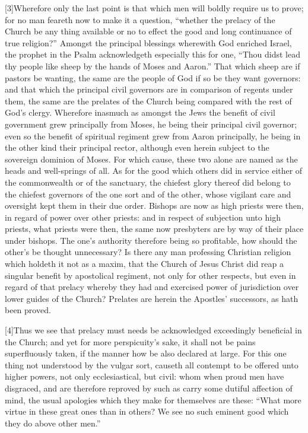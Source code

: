 [3]Wherefore only the last point is that which men will boldly require us to prove; for no man feareth now to make it a question, “whether the prelacy of the Church be any thing available or no to effect the good and long continuance of true religion?” Amongst the principal blessings wherewith God enriched Israel, the prophet in the Psalm acknowledgeth especially this for one, “Thou didst lead thy people like sheep by the hands of Moses and Aaron.” That which sheep are if pastors be wanting, the same are the people of God if so be they want governors: and that which the principal civil governors are in comparison of regents under them, the same are the prelates of the Church being compared with the rest of God’s clergy. Wherefore inasmuch as amongst the Jews the benefit of civil government grew principally from Moses, he being their principal civil  governor; even so the benefit of spiritual regiment grew from Aaron principally, he being in the other kind their principal rector, although even herein subject to the sovereign dominion of Moses. For which cause, these two alone are named as the heads and well-springs of all. As for the good which others did in service either of the commonwealth or of the sanctuary, the chiefest glory thereof did belong to the chiefest governors of the one sort and of the other, whose vigilant care and oversight kept them in their due order. Bishops are now as high priests were then, in regard of power over other priests: and in respect of subjection unto high priests, what priests were then, the same now presbyters are by way of their place under bishops. The one’s authority therefore being so profitable, how should the other’s be thought unnecessary? Is there any man professing Christian religion which holdeth it not as a maxim, that the Church of Jesus Christ did reap a singular benefit by apostolical regiment, not only for other respects, but even in regard of that prelacy whereby they had and exercised power of jurisdiction over lower guides of the Church? Prelates are herein the Apostles’ successors, as hath been proved.

[4]Thus we see that prelacy must needs be acknowledged exceedingly beneficial in the Church; and yet for more perspicuity’s sake, it shall not be pains superfluously taken, if the manner how be also declared at large. For this one thing not understood by the vulgar sort, causeth all contempt to be offered unto higher powers, not only ecclesiastical, but civil: whom when proud men have disgraced, and are therefore reproved by such as carry some dutiful affection of mind, the usual apologies which they make for themselves are these: “What more virtue in these great ones than in others? We see no such eminent good which they do above other men.”

